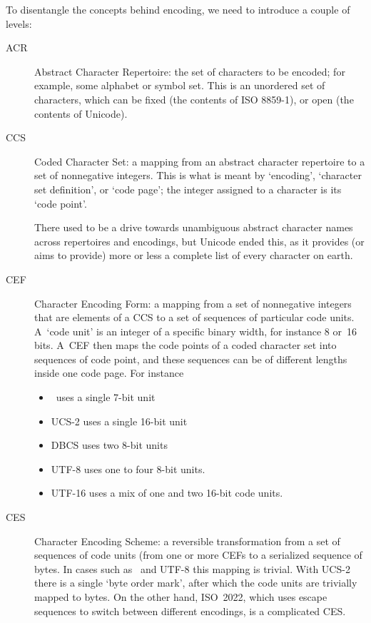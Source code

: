 To disentangle the concepts behind encoding, we need to introduce a
couple of levels:
\begin{description}
\item[ACR] Abstract Character Repertoire: the set of characters to be
  encoded; for example, some alphabet or symbol set. This is an
  unordered set of characters, which can be fixed (the contents of ISO
  8859-1), or open (the contents of Unicode).
\item[CCS] Coded Character Set: a mapping from an abstract character
  repertoire to a set of nonnegative integers. This is what is meant
  by `encoding', `character set definition', or `code page'; the
  integer assigned to a character is its `code
  point'.

  There used to be a drive towards unambiguous abstract character
  names across repertoires and encodings, but Unicode ended this, as
  it provides (or aims to provide) more or less a complete list of
  every character on earth.
\item[CEF] Character Encoding Form: a mapping from a set of
  nonnegative integers that are elements of a CCS to a set of
  sequences of particular code units. A~`code unit'
  is an integer of a specific binary width, for instance 8 or~16
  bits. A~CEF then maps the code points of a coded character set into
  sequences of code point, and these sequences can be of different
  lengths inside one code page. For instance
\begin{itemize}
\item \ascii\ uses a single 7-bit unit
\item UCS-2 uses a single 16-bit unit
\item DBCS uses two 8-bit units
\item UTF-8 uses one to four 8-bit units.
\item UTF-16 uses a mix of one and two 16-bit code units.
\end{itemize}
\item[CES] Character Encoding Scheme: a reversible transformation from
  a set of sequences of code units (from one or more CEFs to a
  serialized sequence of bytes. In cases such as \ascii\ and UTF-8
  this mapping is trivial. With UCS-2 there is a single `byte order mark', after which the code units are
  trivially mapped to bytes. On the other hand, ISO~2022, which uses
  escape sequences to switch between different encodings, is a
  complicated CES.
\end{description}
